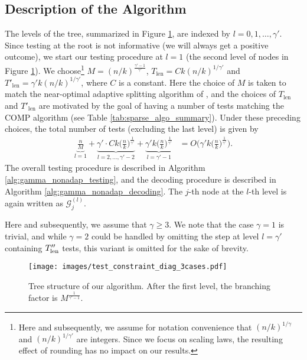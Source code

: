 \subsection{Description of the Algorithm} \label{sec:gamma_algo_descrip}

The levels of the tree, summarized in Figure \ref{fig:test_constraint_diagram_3cases}, are indexed by $l=0,1,\dots,\gamma'$. Since testing at the root is not informative (we will always get a positive outcome), we start our testing procedure at $l=1$ (the second level of nodes in Figure \ref{fig:test_constraint_diagram_3cases}). We choose\footnote{Here and subsequently, we assume for notation convenience that $(n/k)^{1/\gamma}$ and $(n/k)^{1/\gamma'}$ are integers.  Since we focus on scaling laws, the resulting effect of rounding has no impact on our results.} $M=(n/k)^{\frac{\gamma'-1}{\gamma'}}$, $T_{\text{len}}=Ck(n/k)^{1/\gamma'}$ and $T'_{\text{len}}=\gamma'k(n/k)^{1/\gamma'}$, where $C$ is a constant.  Here the choice of $M$ is taken to match the near-optimal adaptive splitting algorithm of \cite{Nel20}, and the choices of $T_{\text{len}}$ and $T'_{\text{len}}$ are motivated by the goal of having a number of tests matching the COMP algorithm (see Table \ref{tab:sparse_algo_summary}).  Under these preceding choices, the total number of tests (excluding the last level) is given by
\begin{align}
    \underbrace{\frac{n}{M}}_{l=1}+\underbrace{\gamma'\cdot Ck\Big(\frac{n}{k}\Big)^{\frac{1}{\gamma'}}}_{l=2,\dotsc,\gamma'-2}+\underbrace{\gamma'k\Big(\frac{n}{k}\Big)^{\frac{1}{\gamma'}}}_{l=\gamma'-1}
    &=O\bigg(\gamma'k\Big(\frac{n}{k}\Big)^{\frac{1}{\gamma'}}\bigg).
\end{align} 
The overall testing procedure is described in Algorithm \ref{alg:gamma_nonadap_testing}, and the decoding procedure is described in Algorithm \ref{alg:gamma_nonadap_decoding}.  The $j$-th node at the $l$-th level is again written as $\mathcal{G}_j^{(l)}$. 

Here and subsequently, we assume that $\gamma \ge 3$.  We note that the case $\gamma = 1$ is trivial, and while $\gamma = 2$ could be handled by omitting the step at level $l = \gamma'$ containing $T''_{\rm len}$ tests, this variant is omitted for the sake of brevity.

\begin{figure}[!t]
  \centering
  \texttt{[image: images/test\_constraint\_diag\_3cases.pdf]}
  \caption{Tree structure of our algorithm. After the first level, the branching factor is $M^{\frac{1}{\gamma'-1}}$.} \label{fig:test_constraint_diagram_3cases}
\end{figure}

